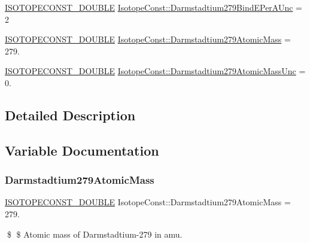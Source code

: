 \begin{DoxyCompactItemize}
\item 
\mbox{\hyperlink{group___isotope_const-_macros_ga8f45a7272ce02c0b4c65c44636ed719a}{I\+S\+O\+T\+O\+P\+E\+C\+O\+N\+S\+T\+\_\+\+D\+O\+U\+B\+LE}} \mbox{\hyperlink{group___isotope_const-_darmstadtium-_ds279_ga41af349594b1c10764010a4ea667b6cc}{Isotope\+Const\+::\+Darmstadtium279\+Bind\+E\+Per\+A\+Unc}} = 2
\item 
\mbox{\hyperlink{group___isotope_const-_macros_ga8f45a7272ce02c0b4c65c44636ed719a}{I\+S\+O\+T\+O\+P\+E\+C\+O\+N\+S\+T\+\_\+\+D\+O\+U\+B\+LE}} \mbox{\hyperlink{group___isotope_const-_darmstadtium-_ds279_ga8f2a37ae4b688145274d24fd7c3b8058}{Isotope\+Const\+::\+Darmstadtium279\+Atomic\+Mass}} = 279.
\item 
\mbox{\hyperlink{group___isotope_const-_macros_ga8f45a7272ce02c0b4c65c44636ed719a}{I\+S\+O\+T\+O\+P\+E\+C\+O\+N\+S\+T\+\_\+\+D\+O\+U\+B\+LE}} \mbox{\hyperlink{group___isotope_const-_darmstadtium-_ds279_ga32ddda172f3a53ed268dcc743c2821dc}{Isotope\+Const\+::\+Darmstadtium279\+Atomic\+Mass\+Unc}} = 0.
\end{DoxyCompactItemize}


\subsection{Detailed Description}


\subsection{Variable Documentation}
\mbox{\label{group___isotope_const-_darmstadtium-_ds279_ga8f2a37ae4b688145274d24fd7c3b8058}} 
\subsubsection{\texorpdfstring{Darmstadtium279\+Atomic\+Mass}{Darmstadtium279AtomicMass}}
{\footnotesize\ttfamily \mbox{\hyperlink{group___isotope_const-_macros_ga8f45a7272ce02c0b4c65c44636ed719a}{I\+S\+O\+T\+O\+P\+E\+C\+O\+N\+S\+T\+\_\+\+D\+O\+U\+B\+LE}} Isotope\+Const\+::\+Darmstadtium279\+Atomic\+Mass = 279.}

\$ \$ Atomic mass of Darmstadtium-\/279 in amu. \mbox{\label{group___isotope_const-_darmstadtium-_ds279_ga32ddda172f3a53ed268dcc743c2821dc}} 
